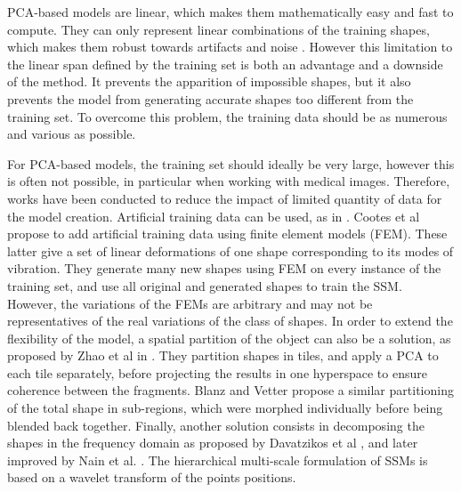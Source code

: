 PCA-based models are linear, which makes them mathematically easy and fast to compute. They can only represent linear combinations of the training shapes, which makes them robust towards artifacts and noise \cite{luthi_2017_gaussian}. However this limitation to the linear span defined by the training set is both an advantage and a downside of the method. It prevents the apparition of impossible shapes, but it also prevents the model from generating accurate shapes too different from the training set. To overcome this problem, the training data should be as numerous and various as possible. 

For PCA-based models, the training set should ideally be very large, however this is often not possible, in particular when working with medical images. Therefore, works have been conducted to reduce the impact of limited quantity of data for the model creation. Artificial training data can be used, as in \cite{cootes_1995_combining}. Cootes et al propose to add artificial training data using finite element models (FEM). These latter give a set of linear deformations of one shape corresponding to its modes of vibration. They generate many new shapes using FEM on every instance of the training set, and use all original and generated shapes to train the SSM. However, the variations of the FEMs are arbitrary and may not be representatives of the real variations of the class of shapes. In order to extend the flexibility of the model, a spatial partition of the object can also be a solution, as proposed by Zhao et al in \cite{zhao_2005_partitioned}. They partition shapes in tiles, and apply a PCA to each tile separately, before projecting the results in one hyperspace to ensure coherence between the fragments. 
Blanz and Vetter \cite{blanz_1999_morphable} propose a similar partitioning of the total shape in sub-regions, which were morphed individually before being blended back together. Finally, another solution consists in decomposing the shapes in the frequency domain as proposed by Davatzikos et al \cite{davatzikos_2003_hierarchical}, and later improved by Nain et al. \cite{nain_2007_multiscale}. The hierarchical multi-scale formulation of SSMs is based on a wavelet transform of the points positions. 


